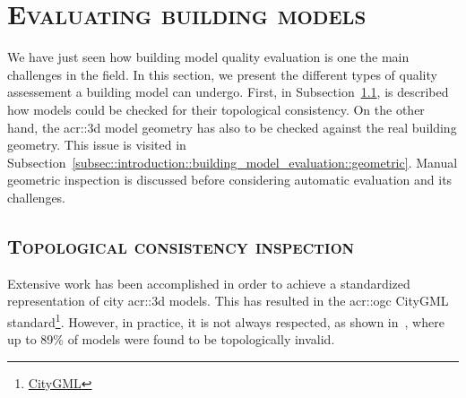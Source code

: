 \section{\textsc{Evaluating building models}}
    \label{sec::introduction::building_model_evaluation}
    We have just seen how building model quality evaluation is one the main challenges in the field.
    In this section, we present the different types of quality assessement a building model can undergo.
    First, in Subsection~\ref{subsec::introduction::building_model_evaluation::topological}, is described how models could be checked for their topological consistency.
    On the other hand, the \gls{acr::3d} model geometry has also to be checked against the real building geometry.
    This issue is visited in Subsection~\ref{subsec::introduction::building_model_evaluation::geometric}.
    Manual geometric inspection is discussed before considering automatic evaluation and its challenges.

    \subsection{\textsc{Topological consistency inspection}}
        \label{subsec::introduction::building_model_evaluation::topological}
        Extensive work has been accomplished in order to achieve a standardized representation of city \gls{acr::3d} models.
        This has resulted in the \gls{acr::ogc} CityGML standard\footnote{\href{https://www.opengeospatial.org/standards/citygml}{CityGML}}.
        However, in practice, it is not always respected, as shown in~\textcite{biljecki2016most}, where up to 89\% of models were found to be topologically invalid.\\

